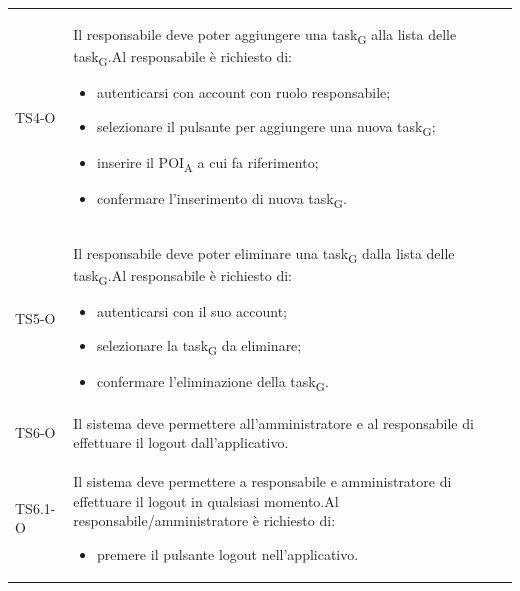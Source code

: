 \begin{longtable}{ >{\centering}p{} >{}p{}}
	TS4-O & Il responsabile deve poter aggiungere una task\textsubscript{G} alla lista delle task\textsubscript{G}.\newline Al responsabile è richiesto di: \begin{itemize}\item autenticarsi con account con ruolo responsabile; \item selezionare il pulsante per aggiungere una nuova task\textsubscript{G}; \item inserire il POI\textsubscript{A} a cui fa riferimento; \item confermare l'inserimento di nuova task\textsubscript{G}. \end{itemize}\tabularnewline
	
	
	
	TS5-O & Il responsabile deve poter eliminare una task\textsubscript{G} dalla lista delle task\textsubscript{G}.\newline Al responsabile è richiesto di: \begin{itemize} \item autenticarsi con il suo account; \item selezionare la task\textsubscript{G} da eliminare; \item confermare l'eliminazione della task\textsubscript{G}. \end{itemize}\tabularnewline
	
	TS6-O & Il sistema deve permettere all'amministratore e al responsabile di effettuare il logout dall'applicativo.\tabularnewline
	TS6.1-O & Il sistema deve permettere a responsabile e amministratore di effettuare il logout in qualsiasi momento.\newline Al responsabile/amministratore è richiesto di: \begin{itemize} \item premere il pulsante logout nell'applicativo. \end{itemize}\tabularnewline
	

\end{longtable}
